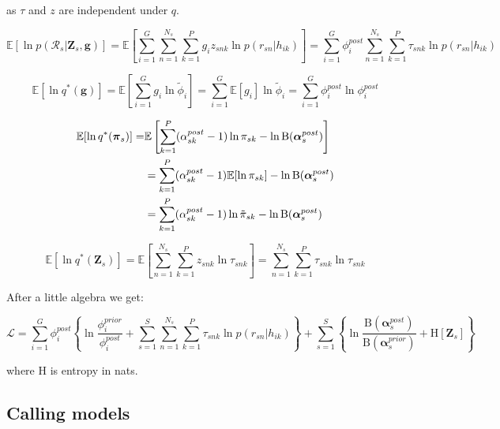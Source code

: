\documentclass{article}
\begin{document}
as $\tau$ and $z$ are independent under $q$.

\begin{equation}
\mathbb{E}[\ln p(\mathcal{R}_s | \boldsymbol{Z}_s, \boldsymbol{g})] = \mathbb{E}\left[ \sum_{i = 1}^G \sum_{n = 1}^{N_s} \sum_{k = 1}^P g_i z_{snk} \ln p(r_{sn} | h_{ik}) \right] = \sum_{i = 1}^G \phi_i^{post} \sum_{n = 1}^{N_s} \sum_{k = 1}^P \tau_{snk} \ln p(r_{sn} | h_{ik})
\end{equation}

\begin{equation}
\mathbb{E}[\ln q^*(\boldsymbol{g})] = \mathbb{E}\left[\sum_{i = 1}^G g_i \ln \tilde{\phi}_i\right] = \sum_{i = 1}^G \mathbb{E}[g_i] \ln \tilde{\phi}_i = \sum_{i = 1}^G \phi_i^{post} \ln \phi_i^{post}
\end{equation}

\begin{align}
\mathbb{E}[\ln q^*(\boldsymbol{\pi}_s)] =& \mathbb{E}\left[\sum_{k = 1}^P (\alpha_{sk}^{post} - 1) \ln \pi_{sk} - \ln \text{B}(\boldsymbol{\alpha}_s^{post})\right] \notag \\ 
&= \sum_{k = 1}^P (\alpha_{sk}^{post} - 1) \mathbb{E} [\ln \pi_{sk}] - \ln \text{B}(\boldsymbol{\alpha}_s^{post}) \notag \\
 &= \sum_{k = 1}^P (\alpha_{sk}^{post} - 1) \ln \tilde{\pi}_{sk} - \ln \text{B}(\boldsymbol{\alpha}_s^{post})
\end{align}

\begin{equation}
\mathbb{E}[\ln q^*(\boldsymbol{Z}_s)] = \mathbb{E}\left[\sum_{n = 1}^{N_s} \sum_{k = 1}^P z_{snk} \ln \tau_{snk} \right] = \sum_{n = 1}^{N_s} \sum_{k = 1}^P \tau_{snk} \ln \tau_{snk}
\end{equation}

After a little algebra we get:

\begin{equation}
\mathcal{L} = \sum_{i = 1}^G \phi_i^{post}\left\{ \ln \frac{\phi_i^{prior}}{\phi_i^{post}} + \sum_{s = 1}^S \sum_{n = 1}^{N_s} \sum_{k = 1}^P \tau_{snk} \ln p(r_{sn} | h_{ik}) \right\} + \sum_{s = 1}^S \left\{ \ln \frac{\text{B}(\boldsymbol{\alpha}_s^{post})}{\text{B}(\boldsymbol{\alpha}_s^{prior})} + \text{H}[\boldsymbol{Z}_s] \right\}
\end{equation}

where $\text{H}$ is entropy in nats.

\subsection{Calling models}\label{calling-models}
\end{document}
